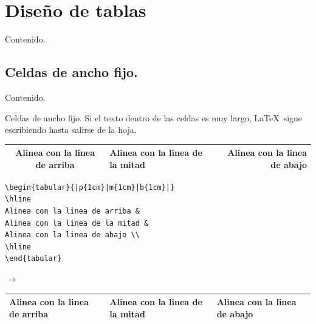 \documentclass[dvipsnames,xcolor, handout]{beamer}
\theoremstyle{plain}
\theoremstyle{definition}
\begin{document}
\section{Diseño de tablas}
\begin{frame}{Contenido.}
\begin{multicols}{2}
  \tableofcontents[currentsection]
\end{multicols}
\end{frame}

\subsection{Celdas de ancho fijo.}
\begin{frame}{Contenido.}
\begin{multicols}{2}
  \tableofcontents[currentsubsection]
\end{multicols}
\end{frame}

\begin{frame}[fragile]{Celdas de ancho fijo.}
Si el texto dentro de las celdas es muy largo, \LaTeX\ sigue escribiendo hasta salirse de la hoja.

\begin{small}
\begin{tabular}{|c|l|r|}
\hline
Alinea con la linea de arriba & 
Alinea con la linea de la mitad &
Alinea con la linea de abajo \\
\hline
\end{tabular}
\end{small}\pause

\begin{minipage}{0.5\linewidth}
\begin{scriptsize}
\begin{verbatim}
\begin{tabular}{|p{1cm}|m{1cm}|b{1cm}|}
\hline
Alinea con la linea de arriba & 
Alinea con la linea de la mitad &
Alinea con la linea de abajo \\
\hline
\end{tabular}
\end{verbatim}
\end{scriptsize}
\end{minipage}
\begin{minipage}{0.05\linewidth}
    $\rightarrow$
\end{minipage}
\begin{minipage}{0.4\linewidth}
\begin{scriptsize}
\begin{tabular}{|p{1cm}|m{1cm}|b{1cm}|}
\hline
Alinea con la linea de arriba & 
Alinea con la linea de la mitad &
Alinea con la linea de abajo \\
\hline
\end{tabular}
    \end{scriptsize}
\end{minipage}
\end{frame}
\end{document}
